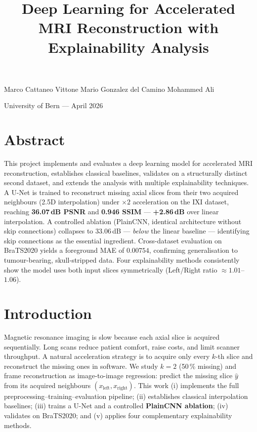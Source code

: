 \documentclass[10pt,a4paper]{article}
\title{Deep Learning for Accelerated MRI Reconstruction with Explainability Analysis}
\makeatletter
\renewcommand{\maketitle}{%
    \begingroup
    \begin{center}
        {\large\bfseries \@title \par}
        \vspace{2pt}
        {\small Marco Cattaneo Vittone \quad Mario Gonzalez del Camino \quad Mohammed Ali \par}
        \vspace{1pt}
        {\footnotesize University of Bern --- April 2026 \par}
    \end{center}
    \vspace{-4pt}
    \endgroup
}
\makeatother
\begin{document}
\maketitle

\section*{Abstract}
\small
\noindent
This project implements and evaluates a deep learning model for accelerated
MRI reconstruction, establishes classical baselines, validates on a structurally
distinct second dataset, and extends the analysis with multiple explainability
techniques. A U-Net is trained to reconstruct missing axial slices from their
two acquired neighbours (2.5D interpolation) under $\times2$ acceleration on
the IXI dataset, reaching \textbf{36.07\,dB PSNR} and \textbf{0.946 SSIM} ---
\textbf{+2.86\,dB} over linear interpolation. A controlled ablation
(PlainCNN, identical architecture without skip connections) collapses to
33.06\,dB --- \emph{below} the linear baseline --- identifying skip
connections as the essential ingredient. Cross-dataset evaluation on
BraTS2020 yields a foreground MAE of $0.00754$, confirming generalisation to
tumour-bearing, skull-stripped data. Four explainability methods consistently
show the model uses both input slices symmetrically (Left/Right
ratio $\approx 1.01$--$1.06$).
\normalsize

\section{Introduction}
Magnetic resonance imaging is slow because each axial slice is acquired
sequentially. Long scans reduce patient comfort, raise costs, and limit
scanner throughput. A natural acceleration strategy is to acquire only every
$k$-th slice and reconstruct the missing ones in software. We study $k{=}2$
(50\,\% missing) and frame reconstruction as image-to-image regression:
predict the missing slice $\hat{y}$ from its acquired neighbours
$(x_{\text{left}}, x_{\text{right}})$.
This work (i) implements the full preprocessing--training--evaluation
pipeline; (ii) establishes classical interpolation baselines; (iii) trains a
U-Net and a controlled \textbf{PlainCNN ablation}; (iv) validates on
BraTS2020; and (v) applies four complementary explainability methods.

\end{document}
